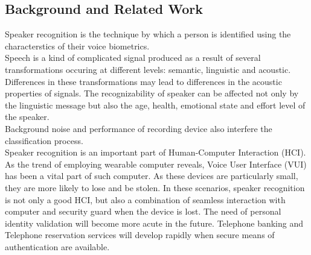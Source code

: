 \subsection{Background and Related Work}
Speaker recognition is the technique by which a person is identified using the characterstics of their voice biometrics. \\
Speech is a kind of complicated signal produced as a result of several transformations occuring at different levels: semantic, linguistic and acoustic. Differences in these transformations may lead to differences in the acoustic properties of signals. The recognizability of speaker can be affected not only by the linguistic message but also the age, health, emotional state and effort level of the speaker. \\
Background noise and performance of recording device also interfere the classification process. \\
Speaker recognition is an important part of Human-Computer Interaction (HCI). As the trend of employing wearable computer reveals, Voice User Interface (VUI) has been a vital part of such computer. As these devices are particularly small, they are more likely to lose and be stolen. In these scenarios, speaker recognition is not only a good HCI, but also a combination of seamless interaction with computer and security guard when the device is lost. The need of personal identity validation will become more acute in the future. Telephone banking and Telephone reservation services will develop rapidly when secure means of authentication are available. \\
